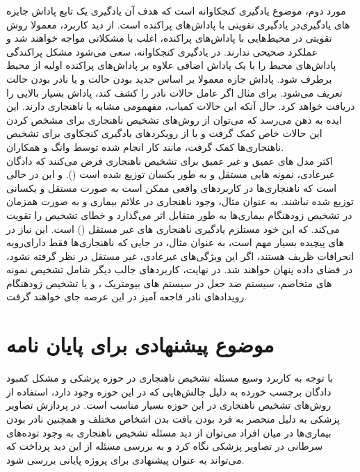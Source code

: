 \documentclass[12pt,a4paper]{report}
\begin{document}
مورد دوم، موضوع یادگیری کنجکاوانه است\cite{https://doi.org/10.48550/arxiv.1810.12894, https://doi.org/10.48550/arxiv.1808.04355, https://doi.org/10.48550/arxiv.1705.05363} که هدف آن یادگیری یک تابع پاداش جایزه در یادگیری تقویتی با پاداش‌های پراکنده است. از دید کاربرد، معمولا روش‌‎های یادگیری تقویتی در محیط‌هایی با پاداش‌های پراکنده، اغلب با مشکلاتی مواجه خواهند شد و عملکرد صحیحی ندارند. در یادگیری کنجکاوانه، سعی می‌شود مشکل پراکندگی پاداش‌های محیط را با یک پاداش اضافی علاوه بر پاداش‌های پراکنده اولیه از محیط برطرف شود. پاداش جازه معمولا بر اساس جدید بودن حالت و یا نادر بودن حالت تعریف می‌شود. برای مثال اگر عامل حالات نادر را کشف کند، پاداش بسیار بالایی را دریافت خواهد کرد. حال آنکه این حالات کمیاب، مفهمومی مشابه با ناهنجاری دارند. این ایده به ذهن می‌رسد که می‌توان از روش‌های تشخیص ناهنجاری برای مشخص کردن این حالات خاص کمک گرفت و یا از رویکرد‌های یادگیری کنجکاوی برای تشخیص ناهنجاری‌ها کمک گرفت، مانند کار انجام شده توسط وانگ و همکاران\cite{ijcai2020p408}.\\

اکثر مدل های عمیق و غیر عمیق برای تشخیص ناهنجاری فرض می‌کنند که دادگان غیرعادی، نمونه هایی مستقل و به طور یکسان توزیع شده است (). و این در حالی است که ناهنجاری‌ها در کاربرد‌های واقعی ممکن است به صورت مستقل و یکسانی توزیع شده نباشند. به عنوان مثال، وجود ناهنجاری در علائم بیماری و به صورت همزمان در تشخیص زودهنگام بیماری‌ها به طور متقابل اثر می‌گذارد و خطای تشخیص را تقویت می‌کند. که این خود مستلزم یادگیری ناهنجاری های غیر مستقل () است\cite{Pang2019NonIIDOD}. این نیاز در رویه‌‎های پیچیده بسیار مهم است، به عنوان مثال، در جایی که ناهنجاری‌ها فقط دارای انحرافات ظریف هستند،‌ اگر این ویژگی‌های غیرعادی، غیر مستقل در نظر گرفته نشود، در فضای داده پنهان خواهند شد. در نهایت، کاربردهای جالب دیگر شامل تشخیص نمونه های متخاصم\cite{https://doi.org/10.48550/arxiv.1702.06280, https://doi.org/10.48550/arxiv.1802.03041}، سیستم ضد جعل در سیستم های بیومتریک \cite{KittlerJosef2020ASEf, PrezCabo2019DeepAD}، و یا تشخیص زودهنگام رویدادهای نادر فاجعه آمیز در این عرصه جای خواهند گرفت.
	\section{موضوع پیشنهادی برای پایان نامه}
با توجه به کاربرد وسیع مسئله تشخیص ناهنجاری در حوزه پزشکی و مشکل کمبود دادگان برچسب خورده به دلیل چالش‌هایی که در این حوزه وجود دارد، استفاده از روش‌های تشخیص ناهنجاری در این حوزه بسیار مناسب است. در پردازش تصاویر پزشکی به دلیل منحصر به فرد بودن بافت بدن اشخاص مختلف و همچنین نادر بودن بیماری‌ها در میان افراد می‌توان از دید مسئله تشخیص ناهنجاری به وجود توده‌های سرطانی در تصاویر پزشکی نگاه کرد و به بررسی مسئله از این دید پرداخت که می‌تواند به عنوان پیشنهادی برای پروژه پایانی بررسی شود.
\newpage
\end{document}
